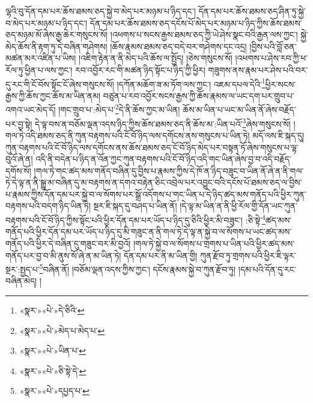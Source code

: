 ལྷའི་བུ་དོན་དམ་པར་ཆོས་ཐམས་ཅད་སྐྱེ་བ་མེད་པར་མཉམ་པ་ཉིད་དང་། དོན་དམ་པར་ཆོས་ཐམས་ཅད་ཤིན་ཏུ་སྐྱེ་བ་མེད་པར་མཉམ་པ་ཉིད་དང་། དོན་དམ་པར་ཆོས་ཐམས་ཅད་དངོས་པོ་མེད་པར་མཉམ་པ་ཉིད་ཀྱིས་ཆོས་ཐམས་ཅད་མཉམ་མོ་ཞེས་རྒྱ་ཆེར་གསུངས་སོ། །འཕགས་པ་སངས་རྒྱས་ཐམས་ཅད་ཀྱི་ཡེ་ཤེས་སྣང་བའི་རྒྱན་ལས་ཀྱང་། སྐྱེ་མེད་ཆོས་ནི་རྟག་ཏུ་དེ་བཞིན་གཤེགས། །ཆོས་རྣམས་ཐམས་ཅད་བདེ་བར་གཤེགས་དང་འདྲ། །བྱིས་པའི་བློ་ཅན་མཚན་མར་འཛིན་པ་ཡིས། །འཇིག་རྟེན་ན་ནི་མེད་པའི་ཆོས་ལ་སྤྱོད། །ཅེས་གསུངས་སོ། །འཕགས་པ་ཤེས་རབ་ཀྱི་ཕ་རོལ་ཏུ་ཕྱིན་པ་ལས་ཀྱང་། རབ་འབྱོར་རང་གི་མཚན་ཉིད་སྟོང་པ་ཉིད་ཀྱི་ཕྱིར། གཟུགས་ནས་རྣམ་པར་ཤེས་པའི་བར་དུ་རང་གི་ངོ་བོས་སྟོང་ངོ་ཞེས་གསུངས་སོ། །དཀོན་མཆོག་ཟ་མ་ཏོག་ལས་ཀྱང་། འཇམ་དཔལ་དེའི་\footnote{«སྣར་»«པེ་»དེ་ཅིའི་}ཕྱིར་སངས་རྒྱས་ཀྱི་ཆོས་ཀྱང་ཆོས་མ་ཡིན་ནམ། བཙུན་པ་རབ་འབྱོར་སངས་རྒྱས་ཀྱི་ཆོས་རྣམས་ལ་ཡང་དག་པར་གྲུབ་པ་འགའ་ཡང་མེད་དོ། །གང་གྲུབ་པ་:མེད་པ་\footnote{«སྣར་»«པེ་»མེད་པ་མེད་པ་}དེ་ནི་ཆོས་ཀྱང་མ་ཡིན། ཆོས་མ་ཡིན་པ་ཡང་མ་ཡིན་ནོ་ཞེས་བརྗོད་པར་བྱ་སྟེ། དེ་ལྟ་བས་ན་བཅོམ་ལྡན་འདས་ཉིད་ཀྱིས་ཆོས་ཐམས་ཅད་ནི་ཆོས་མ་:ཡིན་པའོ་\footnote{«སྣར་»«པེ་»ཡིན་པ་}ཞེས་གསུངས་སོ། །གལ་ཏེ་འདི་ཐམས་ཅད་ནི་ཀུན་བརྟགས་པའི་ངོ་བོ་ཉིད་ལས་དགོངས་ནས་གསུངས་པ་ཡིན་ཏེ། མདོ་ལས་ཇི་སྐད་དུ། ཀུན་བརྟགས་པའི་ངོ་བོ་ཉིད་ལས་དགོངས་ནས་ཆོས་ཐམས་ཅད་ངོ་བོ་ཉིད་མེད་པར་བསྟན་ཏོ་ཞེས་གསུངས་པ་ལྟ་བུའོ་ཞེ་ན། འདི་ནི་བདེན་པ་ཉིད་ན་འོན་ཀྱང་ཀུན་བརྟགས་པའི་ངོ་བོ་ཉིད་འདི་གང་ཡིན་ཞེས་བྱ་བ་འདི་བརྗོད་དགོས་སོ། །གལ་ཏེ་གང་ཚད་མས་གནོད་བཞིན་དུ་བྱིས་པ་རྣམས་ཀྱིས་དེ་ཁོ་ན་ཉིད་བཟུང་བ་ཡིན་ནོ་ཞེ་ན་ནི་གལ་ཏེ་དེ་ལྟ་ན་ནི་སྒྱུ་མ་བཞིན་དུ་མ་བརྟགས་ན་དགའ་བརྟེན་ཅིང་འབྲེལ་པར་འབྱུང་བའི་དངོས་པོ་ཐམས་ཅད་ལ་བྱིས་པ་རྣམས་ཀྱིས་དོན་དམ་པར་སྐྱེ་བ་ལ་སོགས་པར་སྒྲོ་འདོགས་པ་གང་ཡིན་པ་དེ་ཉིད་ཚད་མས་གནོད་པའི་ཕྱིར་ཀུན་བརྟགས་པའི་བདག་ཉིད་ཡིན་ཏེ། སྔར་ཇི་སྐད་དུ་བཤད་པ་ཡིན་ནོ། །དེ་ལྟ་མ་ཡིན་ན་ནི་ཕྱི་རོལ་གྱི་དོན་ཡང་ཀུན་བརྟགས་པའི་ངོ་བོ་ཉིད་ཀྱིས་སྟོང་པའི་ཕྱིར་དོན་དམ་པར་ཡོད་པ་ཉིད་དུ་ཅིའི་ཕྱིར་མི་བཟུང་། :ཅི་སྟེ་\footnote{«སྣར་»«པེ་»ཅི་སྟེ་དེ་}ཚད་མས་གནོད་པའི་ཕྱིར་དོན་དམ་པར་ཡོད་པ་ཉིད་དུ་མི་གཟུང་ན་ནི་གལ་ཏེ་དེ་ལྟ་ན་སྐྱེ་བ་ལ་སོགས་པ་ཡང་ཚད་མས་གནོད་པའི་ཕྱིར་དེ་བཞིན་དུ་གཟུང་བར་མི་བྱའོ། །གལ་ཏེ་སྐྱེ་བ་ལ་སོགས་པ་གྲགས་པ་ཡིན་པའི་ཕྱིར་ཚད་མས་གནོད་པར་བྱ་བ་མི་ནུས་སོ་ཞེ་ན་མ་ཡིན་ཏེ། དོན་དམ་པར་ནི་མ་ཡིན་གྱི། ཀུན་རྫོབ་ཏུ་གྲགས་པའི་ཕྱིར་ཇི་ལྟར་སྔར་:སྤྱད་པ་\footnote{«སྣར་»«པེ་»དཔྱད་པ་}བཞིན་ནོ། །བཅོམ་ལྡན་འདས་ཀྱིས་ཀྱང་། དངོས་རྣམས་སྐྱེ་བ་ཀུན་རྫོབ་ཏུ། །དམ་པའི་དོན་དུ་རང་བཞིན་མེད། །
